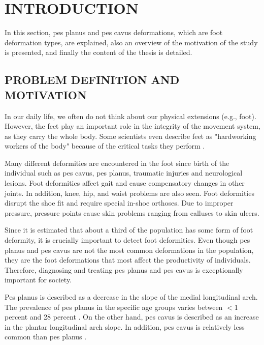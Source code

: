 \chapter{INTRODUCTION}\label{chp:intro}


In this section, pes planus and pes cavus deformations, which are foot deformation types, are explained, also an overview of the motivation of the study is presented, and finally the content of the thesis is detailed.

\section{PROBLEM DEFINITION AND MOTIVATION}
In our daily life, we often do not think about our physical extensions (e.g., foot). However, the feet play an important role in the integrity of the movement system, as they carry the whole body. Some scientists even describe feet as "hardworking workers of the body" because of the critical tasks they perform \cite{veli2004shoes}.

Many different deformities are encountered in the foot since birth of the individual such as pes cavus, pes planus, traumatic injuries and neurological lesions. Foot deformities affect gait and cause compensatory changes in other joints. In addition, knee, hip, and waist problems are also seen. Foot deformities disrupt the shoe fit and require special in-shoe orthoses. Due to improper pressure, pressure points cause skin problems ranging from calluses to skin ulcers.

Since it is estimated that about a third of the population has some form of foot deformity, it is crucially important to detect foot deformities. Even though pes planus and pes cavus are not the most common deformations in the population, they are the foot deformations that most affect the productivity of individuals. Therefore, diagnosing and treating pes planus and pes cavus is exceptionally important for society.

Pes planus is described as a decrease in the slope of the medial longitudinal arch. The prevalence of pes planus in the specific age groups varies between $<$1 percent and 28 percent \cite{ccilli2009prevalence, pfeiffer2006prevalence, abdel2006flat, chen2009flatfoot}. On the other hand, pes cavus is described as an increase in the plantar longitudinal arch slope. In addition, pes cavus is relatively less common than pes planus \cite{kharbuja2017prevalence}.

